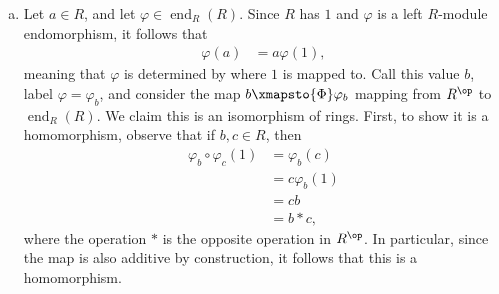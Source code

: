 \documentclass[10pt]{mypackage}
\begin{document}
\begin{solution}\hfill
  \begin{enumerate}[(a)]
    \item Let $a\in R$, and let $\varphi\in \operatorname{end}_R(R)$. Since $R$ has $1$ and $\varphi$ is a left $R$-module endomorphism, it follows that
      \begin{align*}
        \varphi\left( a \right) &= a\varphi\left( 1 \right),
      \end{align*}
      meaning that $\varphi$ is determined by where $1$ is mapped to. Call this value $b$, label $\varphi = \varphi_b$, and consider the map $b\xmapsto{\Phi} \varphi_b$ mapping from $R^{\op}$ to $\operatorname{end}_R(R)$. We claim this is an isomorphism of rings. First, to show it is a homomorphism, observe that if $b,c\in R$, then
      \begin{align*}
        \varphi_b\circ \varphi_c(1) &= \varphi_b\left(c\right)\\
                                    &= c\varphi_b(1)\\
                                    &= cb\\
                                    &= b\ast c,
      \end{align*}
      where the operation $\ast$ is the opposite operation in $R^{\op}$. In particular, since the map is also additive by construction, it follows that this is a homomorphism.


\end{enumerate}
\end{solution}
\end{document}
